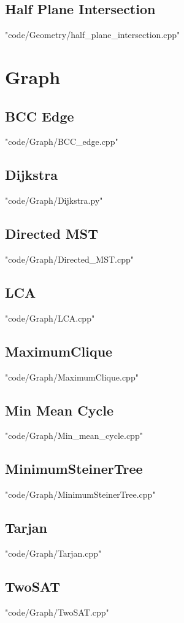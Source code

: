 \subsection{Half Plane Intersection}
 {"code/Geometry/half_plane_intersection.cpp"}
\section{Graph}
\subsection{BCC Edge}
 {"code/Graph/BCC_edge.cpp"}
\subsection{Dijkstra}
 {"code/Graph/Dijkstra.py"}
\subsection{Directed MST}
 {"code/Graph/Directed_MST.cpp"}
\subsection{LCA}
 {"code/Graph/LCA.cpp"}
\subsection{MaximumClique}
 {"code/Graph/MaximumClique.cpp"}
\subsection{Min Mean Cycle}
 {"code/Graph/Min_mean_cycle.cpp"}
\subsection{MinimumSteinerTree}
 {"code/Graph/MinimumSteinerTree.cpp"}
\subsection{Tarjan}
 {"code/Graph/Tarjan.cpp"}
\subsection{TwoSAT}
 {"code/Graph/TwoSAT.cpp"}
